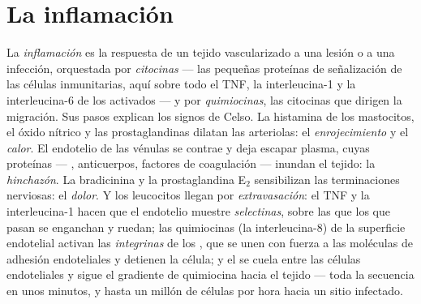 \section{La inflamación}

\begin{definition}\label{def:b3:innate-immunity:inflammation}
La \emph{inflamación} es la respuesta de un tejido vascularizado a una
lesión o a una infección, orquestada por \emph{citocinas} --- las
pequeñas proteínas de señalización de las células inmunitarias, aquí
sobre todo el TNF, la interleucina-1 y la interleucina-6 de los
 activados --- y por \emph{quimiocinas}, las citocinas que
dirigen la migración. Sus pasos explican los signos de Celso. La
histamina de los mastocitos, el óxido nítrico y las prostaglandinas
dilatan las arteriolas: el \emph{enrojecimiento} y el \emph{calor}. El
endotelio de las vénulas se contrae y deja escapar plasma, cuyas
proteínas --- , anticuerpos, factores de coagulación ---
inundan el tejido: la \emph{hinchazón}. La bradicinina y la
prostaglandina E$_{2}$ sensibilizan las terminaciones nerviosas: el
\emph{dolor}. Y los leucocitos llegan por \emph{extravasación}: el TNF y
la interleucina-1 hacen que el endotelio muestre \emph{selectinas},
sobre las que los  que pasan se enganchan y ruedan; las
quimiocinas (la interleucina-8) de la superficie endotelial activan las
\emph{integrinas} de los , que se unen con fuerza a las
moléculas de adhesión endoteliales y detienen la célula; y el 
se cuela entre las células endoteliales y sigue el gradiente de
quimiocina hacia el tejido --- toda la secuencia en unos minutos, y hasta
un millón de células por hora hacia un sitio infectado.
\end{definition}

